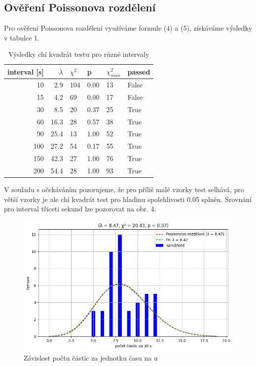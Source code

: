 \documentclass[czech,11pt,a4paper]{article}
\begin{document}
\begin{multicols}{2}
\begin{figure}[H]
		\end{figure}
		\subsection{Ověření Poissonova rozdělení}
		Pro ověření Poissonova rozdělení využíváme formule (4) a (5), získáváme výsledky v tabulce 1.
		\begin{table}[H]
			\begin{tabular}{rrllll}
				interval {[}s{]} & $\overline{\lambda}$ & $\chi ^2$ & p        & $\chi^2_{max}$ & passed \\ \hline
				10               & 2.9  & 104 & 0.00 & 13          & False  \\
				15               & 4.2  & 69 & 0.00 & 17          & False   \\
				30               & 8.5  & 20 & 0.37 & 25          & True   \\
				60               & 16.3 & 28 & 0.57 & 38          & True   \\
				90               & 25.4 & 13 & 1.00 & 52          & True   \\
				100              & 27.2 & 54 & 0.17 & 55          & True   \\
				150              & 42.3 & 27 & 1.00 & 76          & True   \\
				200              & 54.4 & 28 & 1.00 & 93          & True  
			\end{tabular}
			\caption{Výsledky chí kvadrát testu pro různé intervaly}
		\end{table}
		V souladu s očekáváním pozorujeme, že pro příliš malé vzorky test selhává, pro větší vzorky je ale chí kvadrát test pro hladinu spolehlivosti 0.05 splněn. Srovnání pro interval třiceti sekund lze pozorovat na obr. 4.
			\begin{figure}[H]
			\centering
			\includegraphics[width=0.9\linewidth]{fig4}
			\caption{Závislost počtu částic za jednotku času na u}
			

\end{figure}
\end{multicols}
\end{document}
